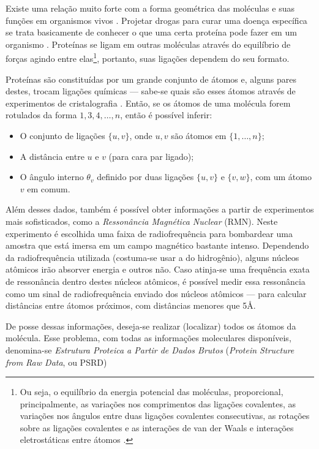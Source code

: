Existe uma relação muito forte com a forma geométrica das moléculas e suas funções em organismos vivos \cite{bioquimicaLehninger}. Projetar drogas para curar uma doença específica se trata basicamente de conhecer o que uma certa proteína pode fazer em um organismo \cite{libertiEDG}. Proteínas se ligam em outras moléculas através do equilíbrio de forças agindo entre elas\footnote{Ou seja, o equilíbrio da energia potencial das moléculas, proporcional, principalmente, as variações nos comprimentos das ligações covalentes, as variações nos ângulos entre duas ligações covalentes consecutivas, as rotações sobre as ligações covalentes e as interações de van der Waals e interações eletrostáticas entre átomos \cite{carlileTese}.}, portanto, suas ligações dependem do seu formato. 

Proteínas são constituídas por um grande conjunto de átomos e, alguns pares destes, trocam ligações químicas --- sabe-se quais são esses átomos através de experimentos de cristalografia \cite{ramachandran1974MolStructure}. Então, se os átomos de uma molécula forem rotulados da forma $1,3,4,\dots,n$, então é possível inferir: 
\begin{itemize}
	\item O conjunto de ligações $\{u,v\}$, onde $u,v$ são átomos em $\{1,\dots,n\}$;
	\item A distância entre $u$ e $v$ (para cara par ligado);
	\item O ângulo interno $\theta_v$ definido por duas ligações $\{u,v\}$ e $\{v,w\}$, com um átomo $v$ em comum.
\end{itemize} 

Além desses dados, também é possível obter informações a partir de experimentos mais sofisticados, como a \textit{Ressonância Magnética Nuclear} (RMN). Neste experimento é escolhida uma faixa de radiofrequência para bombardear uma amostra que está imersa em um campo magnético bastante intenso. Dependendo da radiofrequência utilizada (costuma-se usar a do hidrogênio), alguns núcleos atômicos irão absorver energia e outros não. Caso atinja-se uma frequência exata de ressonância dentro destes núcleos atômicos, é possível medir essa ressonância como um sinal de radiofrequência enviado dos núcleos atômicos --- para calcular distâncias entre átomos próximos, com distâncias menores que 5\AA.

De posse dessas informações, deseja-se realizar (localizar) todos os átomos da molécula. Esse problema, com todas as informações moleculares disponíveis, denomina-se \textit{Estrutura Proteica a Partir de Dados Brutos} (\textit{Protein Structure from Raw Data}, ou PSRD)

